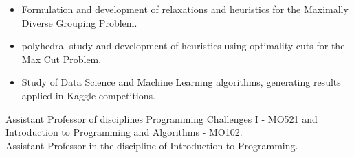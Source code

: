 \documentclass[10pt,a4paper,ragged2e,withhyper]{altacv}
\begin{document}
\begin{paracol}{2}
        \begin{itemize}
        	\item Formulation and development of relaxations and heuristics for the Maximally Diverse Grouping Problem.
        	\item polyhedral study and development of heuristics using optimality cuts for the Max Cut Problem.
        	\item Study of Data Science and Machine Learning algorithms, generating results applied in Kaggle competitions.
        \end{itemize}
        \vspace*{-0.2cm}
        \medskip
        {Assistant Professor of disciplines Programming Challenges I - MO521 and
          Introduction to Programming and Algorithms - MO102. \\}
        \divider
        \medskip
        {Assistant Professor in the discipline of Introduction to Programming. \\}
        \divider
    \end{paracol}
    
\end{document}

